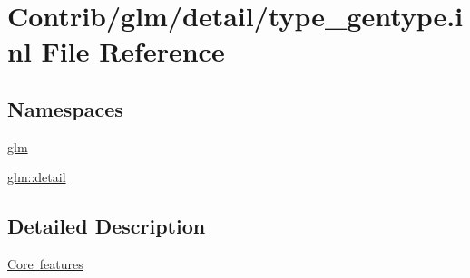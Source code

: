 \hypertarget{type__gentype_8inl}{}\section{Contrib/glm/detail/type\+\_\+gentype.inl File Reference}
\label{type__gentype_8inl}
\subsection*{Namespaces}
\begin{DoxyCompactItemize}
\item 
 \mbox{\hyperlink{namespaceglm}{glm}}
\item 
 \mbox{\hyperlink{namespaceglm_1_1detail}{glm\+::detail}}
\end{DoxyCompactItemize}


\subsection{Detailed Description}
\mbox{\hyperlink{group__core}{Core features}} 